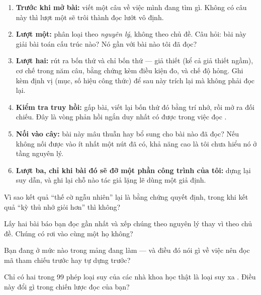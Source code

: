 \documentclass[../hieu-suat.tex]{subfiles}
\begin{document}
\begin{enumerate}
\item \textbf{Trước khi mở bài:} viết một câu về việc mình đang tìm gì. Không có câu này thì lượt một sẽ trôi thành đọc lướt vô định.
\item \textbf{Lượt một:} phân loại theo \emph{nguyên lý}, không theo chủ đề. Câu hỏi: bài này giải bài toán cấu trúc nào? Nó gần với bài nào tôi đã đọc?
\item \textbf{Lượt hai:} rút ra bốn thứ và chỉ bốn thứ --- giả thiết (kể cả giả thiết ngầm), cơ chế trong năm câu, bằng chứng kèm điều kiện đo, và chế độ hỏng. Ghi kèm định vị (mục, số hiệu công thức) để sau này trích lại mà không phải đọc lại.
\item \textbf{Kiểm tra truy hồi:} gấp bài, viết lại bốn thứ đó bằng trí nhớ, rồi mở ra đối chiếu. Đây là vòng phản hồi ngắn duy nhất có được trong việc đọc \nM{}.
\item \textbf{Nối vào cây:} bài này mâu thuẫn hay bổ sung cho bài nào đã đọc? Nếu không nối được vào ít nhất một nút đã có, khả năng cao là tôi chưa hiểu nó ở tầng nguyên lý.
\item \textbf{Lượt ba, chỉ khi bài đó sẽ đỡ một phần công trình của tôi:} dựng lại suy dẫn, và ghi lại chỗ nào tác giả lặng lẽ dùng một giả định.
\end{enumerate}

\begin{traloi}
\end{traloi}

\begin{tukiem}
\item Vì sao kết quả ``thế cờ ngẫu nhiên'' lại là bằng chứng quyết định, trong khi kết quả ``kỳ thủ nhớ giỏi hơn'' thì không?
\item Lấy hai bài báo bạn đọc gần nhất và xếp chúng theo nguyên lý thay vì theo chủ đề. Chúng có rơi vào cùng một họ không?
\item Bạn đang ở mức nào trong mảng đang làm --- và điều đó nói gì về việc nên đọc mã tham chiếu trước hay tự dựng trước?
\item Chỉ có hai trong 99 phép loại suy của các nhà khoa học thật là loại suy xa \cite{dunbar1997}. Điều này đổi gì trong chiến lược đọc của bạn?
\end{tukiem}
\end{document}
